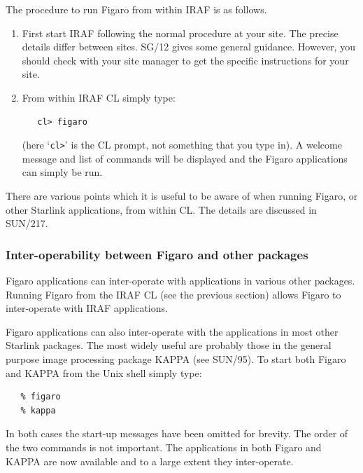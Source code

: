 \documentclass[11pt,twoside]{article}
\newcommand{\xref}[3]{#1}
\begin{document}
   The procedure to run Figaro from within IRAF is as follows.

  \begin{enumerate}

    \item First start IRAF following the normal procedure at your site.
     The precise details differ between sites.  \xref{SG/12}{sg12}{}
     gives some general guidance.   However, you should check with your
     site manager to get the specific instructions for your site.

    \item From within IRAF CL simply type:

\begin{verbatim}
   cl> figaro
\end{verbatim}

     (here `\verb-cl>-' is the CL prompt, not something that you type
     in).  A welcome message and list of commands will be displayed and
     the Figaro applications can simply be run.

  \end{enumerate}

   There are various points which it is useful to be aware of when
   running Figaro, or other Starlink applications, from within CL.
   The details are discussed in \xref{SUN/217}{sun217}{}.

\subsubsection{Inter-operability between Figaro and other packages}

   Figaro applications can inter-operate with applications in various
   other packages.  Running Figaro from the IRAF CL (see the previous
   section) allows Figaro to inter-operate with IRAF applications.

   Figaro applications can also inter-operate with the applications in
   most other Starlink packages.   The most widely useful are
   probably those in the general purpose image processing package
   KAPPA (see \xref{SUN/95}{sun95}{}).  To start both Figaro and KAPPA
   from the Unix shell simply type:

\begin{verbatim}
   % figaro
   % kappa
\end{verbatim}

   In both cases the start-up messages have been omitted for brevity.
   The order of the two commands is not important.  The applications in
   both Figaro and KAPPA are now available and to a large extent they
   inter-operate.
\end{document}
